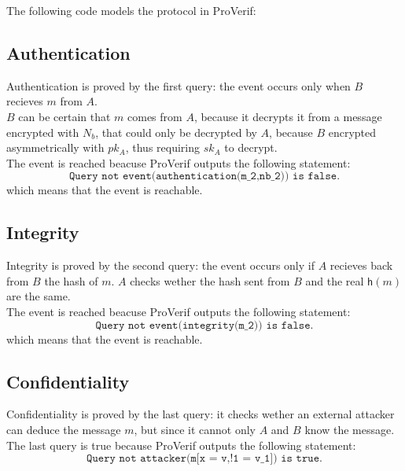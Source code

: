 The following code models the protocol in ProVerif:

\texttt{}

\subsection{Authentication}
Authentication is proved by the first query: the event occurs only when $B$ recieves $m$ from $A$. \\
$B$ can be certain that $m$ comes from $A$, because it decrypts it from a message encrypted with $N_b$, that could only be decrypted by $A$, because $B$ encrypted asymmetrically with $pk_A$, thus requiring $sk_A$ to decrypt. \\
The event is reached beacuse ProVerif outputs the following statement:
$$
\texttt{Query not event(authentication(m\_2,nb\_2)) is false.}
$$
which means that the event is reachable.

\subsection{Integrity}
Integrity is proved by the second query: the event occurs only if $A$ recieves back from $B$ the hash of $m$. $A$ checks wether the hash sent from $B$ and the real $\mathsf{h}(m)$ are the same. \\
The event is reached beacuse ProVerif outputs the following statement:
$$
\texttt{Query not event(integrity(m\_2)) is false.}
$$
which means that the event is reachable.

\subsection{Confidentiality}
Confidentiality is proved by the last query: it checks wether an external attacker can deduce the message $m$, but since it cannot only $A$ and $B$ know the message. \\
The last query is true because ProVerif outputs the following statement:
$$
\texttt{Query not attacker(m[x = v,!1 = v\_1]) is true.}
$$
